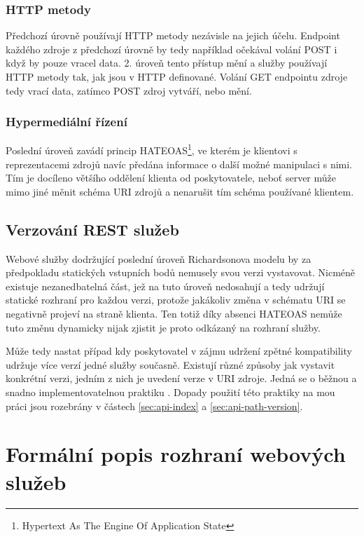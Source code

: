 \documentclass[czech,DP]{thesiskiv}
\begin{document}
\subsubsection{HTTP metody}
Předchozí úrovně používají HTTP metody nezávisle na jejich účelu. Endpoint každého zdroje z předchozí úrovně by tedy například očekával volání POST i když by pouze vracel data. 2. úroveň tento přístup mění a služby používají HTTP metody tak, jak jsou v HTTP definované. Volání GET endpointu zdroje tedy vrací data, zatímco POST zdroj vytváří, nebo mění. 

\subsubsection{Hypermediální řízení}
Poslední úroveň zavádí princip HATEOAS\footnote{Hypertext As The Engine Of Application State}, ve kterém je klientovi s reprezentacemi zdrojů navíc předána informace o další možné manipulaci s nimi. Tím je docíleno většího oddělení klienta od poskytovatele, neboť server může mimo jiné měnit schéma URI zdrojů a nenarušit tím schéma používané klientem.

\subsection{Verzování REST služeb}

Webové služby dodržující poslední úroveň Richardsonova modelu by za předpokladu statických vstupních bodů nemusely svou verzi vystavovat. Nicméně existuje nezanedbatelná část, jež na tuto úroveň nedosahují a tedy udržují statické rozhraní pro každou verzi, protože jakákoliv změna v schématu URI se negativně projeví na straně klienta. Ten totiž díky absenci HATEOAS nemůže tuto změnu dynamicky nijak zjistit je proto odkázaný na rozhraní služby. 

Může tedy nastat případ kdy poskytovatel v zájmu udržení zpětné kompatibility udržuje více verzí jedné služby současně. Existují různé způsoby jak vystavit konkrétní verzi, jedním z nich je uvedení verze v URI zdroje. Jedná se o běžnou a snadno implementovatelnou praktiku \cite{restApiVersion}\cite{restfulWebServices}. Dopady použití této praktiky na mou práci jsou rozebrány v částech \ref{sec:api-index} a \ref{sec:api-path-version}.


\section{Formální popis rozhraní webových služeb}
\end{document}

